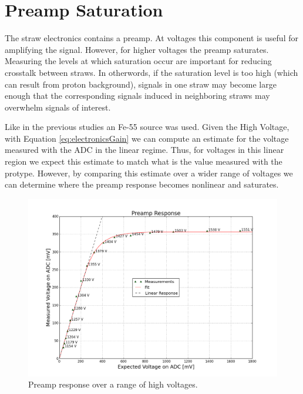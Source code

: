 \section{Preamp Saturation \label{sec:preampSaturation}}
The straw electronics contains a preamp. At voltages this component is useful for amplifying the signal. However, for higher voltages the preamp saturates. Measuring the levels at which saturation occur are important for reducing crosstalk between straws. In otherwords, if the saturation level is too high (which can result from proton background), signals in one straw may become large enough that the corresponding signals induced in neighboring straws may overwhelm signals of interest. 

Like in the previous studies an Fe-55 source was used. %
Given the High Voltage, with Equation \ref{eq:electronicsGain} we can compute an estimate for the voltage measured with the ADC in the linear regime. Thus, for voltages in this linear region we expect this estimate to match what is the value measured with the protype. However, by comparing this estimate over a wider range of voltages we can determine where the preamp response becomes nonlinear and saturates.

\begin{figure}[htp!]
    \centering
    \includegraphics[scale=0.4]{Images2/preampResponse.png}
    \caption{Preamp response over a range of high voltages.}
    \label{fig:preampResponse}
\end{figure} 

